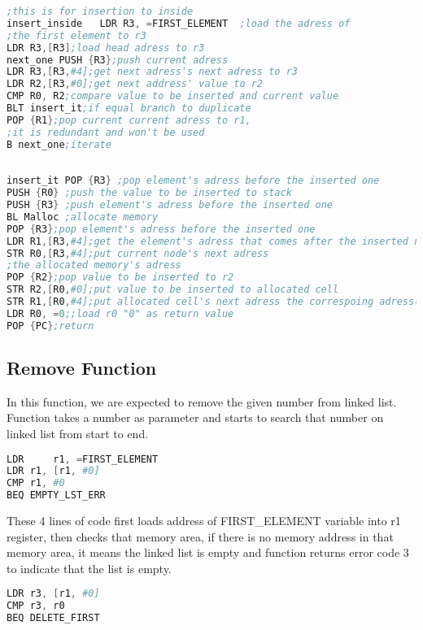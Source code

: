 \documentclass[pdftex,12pt,a4paper]{article}
\begin{document}
\begin{lstlisting}[language=Assembler]
;this is for insertion to inside
insert_inside	LDR R3, =FIRST_ELEMENT	;load the adress of 
;the first element to r3	
LDR R3,[R3];load head adress to r3
next_one PUSH {R3};push current adress
LDR R3,[R3,#4];get next adress's next adress to r3
LDR R2,[R3,#0];get next address' value to r2
CMP R0, R2;compare value to be inserted and current value
BLT insert_it;if equal branch to duplicate
POP {R1};pop current current adress to r1, 
;it is redundant and won't be used
B next_one;iterate
				
				
insert_it POP {R3} ;pop element's adress before the inserted one
PUSH {R0} ;push the value to be inserted to stack
PUSH {R3} ;push element's adress before the inserted one
BL Malloc ;allocate memory
POP {R3};pop element's adress before the inserted one 
LDR R1,[R3,#4];get the element's adress that comes after the inserted node to r1
STR R0,[R3,#4];put current node's next adress 
;the allocated memory's adress
POP {R2};pop value to be inserted to r2
STR R2,[R0,#0];put value to be inserted to allocated cell
STR R1,[R0,#4];put allocated cell's next adress the correspoing adress(r1)
LDR R0, =0;;load r0 "0" as return value
POP {PC};return
\end{lstlisting}
\subsection{Remove Function}

In this function, we are expected to remove the given number from linked list. Function takes a number as parameter and starts to search that number on linked list from start to end.

\begin{lstlisting}[language=Assembler]
LDR 	r1, =FIRST_ELEMENT
LDR	r1, [r1, #0]
CMP	r1, #0
BEQ	EMPTY_LST_ERR
\end{lstlisting}

These 4 lines of code first loads address of FIRST\_ELEMENT variable into r1 register, then checks that memory area, if there is no memory address in that memory area, it means the linked list is empty and function returns error code 3 to indicate that the list is empty.

\begin{lstlisting}[language=Assembler]
LDR	r3, [r1, #0]
CMP	r3, r0
BEQ	DELETE_FIRST
\end{lstlisting}
\end{document}
